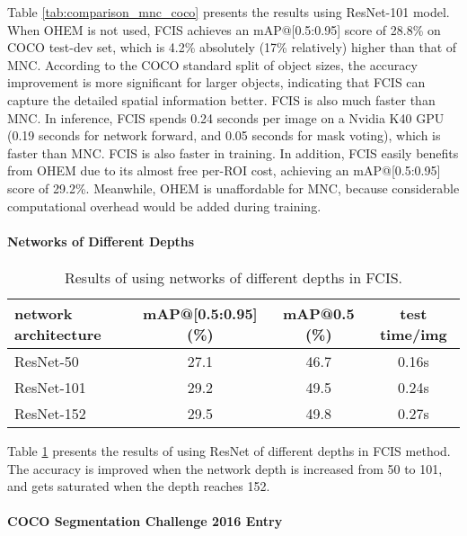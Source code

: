 \documentclass[10pt,twocolumn,letterpaper]{article}
\begin{document}
Table \ref{tab:comparison_mnc_coco} presents the results using ResNet-101 model. When OHEM is not used, FCIS achieves an mAP@[0.5:0.95] score of 28.8\% on COCO test-dev set, which is 4.2\% absolutely (17\% relatively) higher than that of MNC. According to the COCO standard split of object sizes, the accuracy improvement is more significant for larger objects, indicating that FCIS can capture the detailed spatial information better. FCIS is also much faster than MNC. In inference, FCIS spends 0.24 seconds per image on a Nvidia K40 GPU (0.19 seconds for network forward, and 0.05 seconds for mask voting), which is  faster than MNC. FCIS is also  faster in training. In addition, FCIS easily benefits from OHEM due to its almost free per-ROI cost, achieving an mAP@[0.5:0.95] score of 29.2\%. Meanwhile, OHEM is unaffordable for MNC, because considerable computational overhead would be added during training.

\paragraph{Networks of Different Depths}

\setlength{\tabcolsep}{4pt}
\renewcommand{\arraystretch}{1.2}
\begin{table}
\begin{center}
\small
\begin{tabular}{l|c|c|c}
\hline
\scriptsize network architecture & \scriptsize mAP@[0.5:0.95] (\%) & \scriptsize mAP@0.5 (\%) & \scriptsize test time/img\\
\hline
\hline
\footnotesize ResNet-50    & 27.1 & 46.7 & 0.16s \\
\footnotesize ResNet-101   & 29.2 & 49.5 & 0.24s \\
\footnotesize ResNet-152   & 29.5 & 49.8 & 0.27s \\
\hline
\end{tabular}
\end{center}
\caption{Results of using networks of different depths in FCIS.}
\label{tab:depth_coco}
\end{table}

Table \ref{tab:depth_coco} presents the results of using ResNet of different depths in FCIS method. The accuracy is improved when the network depth is increased from 50 to 101, and gets saturated when the depth reaches 152.

\paragraph{COCO Segmentation Challenge 2016 Entry}
\end{document}
